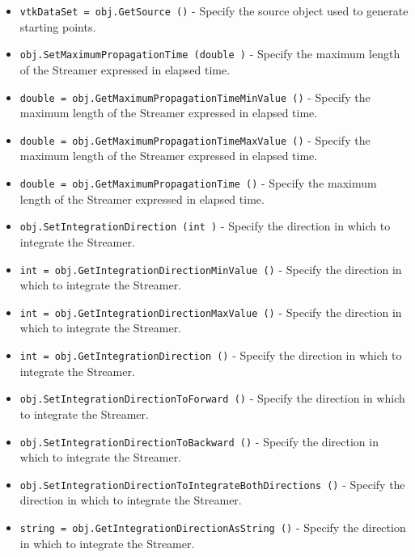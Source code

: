 \begin{itemize}
\item  \verb|vtkDataSet = obj.GetSource ()| -  Specify the source object used to generate starting points.

\item  \verb|obj.SetMaximumPropagationTime (double )| -  Specify the maximum length of the Streamer expressed in elapsed time.

\item  \verb|double = obj.GetMaximumPropagationTimeMinValue ()| -  Specify the maximum length of the Streamer expressed in elapsed time.

\item  \verb|double = obj.GetMaximumPropagationTimeMaxValue ()| -  Specify the maximum length of the Streamer expressed in elapsed time.

\item  \verb|double = obj.GetMaximumPropagationTime ()| -  Specify the maximum length of the Streamer expressed in elapsed time.

\item  \verb|obj.SetIntegrationDirection (int )| -  Specify the direction in which to integrate the Streamer.

\item  \verb|int = obj.GetIntegrationDirectionMinValue ()| -  Specify the direction in which to integrate the Streamer.

\item  \verb|int = obj.GetIntegrationDirectionMaxValue ()| -  Specify the direction in which to integrate the Streamer.

\item  \verb|int = obj.GetIntegrationDirection ()| -  Specify the direction in which to integrate the Streamer.

\item  \verb|obj.SetIntegrationDirectionToForward ()| -  Specify the direction in which to integrate the Streamer.

\item  \verb|obj.SetIntegrationDirectionToBackward ()| -  Specify the direction in which to integrate the Streamer.

\item  \verb|obj.SetIntegrationDirectionToIntegrateBothDirections ()| -  Specify the direction in which to integrate the Streamer.

\item  \verb|string = obj.GetIntegrationDirectionAsString ()| -  Specify the direction in which to integrate the Streamer.


\end{itemize}

